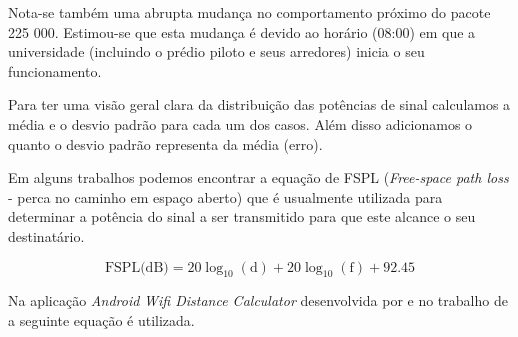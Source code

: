 Nota-se também uma abrupta mudança no comportamento próximo do pacote 225 000.
Estimou-se que esta mudança é devido ao horário (08:00) em que a universidade
(incluindo o prédio piloto e seus arredores) inicia o seu funcionamento.

Para ter uma visão geral clara da distribuição das potências de sinal calculamos
a média e o desvio padrão para cada um dos casos. Além disso adicionamos o
quanto o desvio padrão representa da média (erro).

\begin{table}[htb]
\end{table}


Em alguns trabalhos podemos
encontrar a equação de FSPL (\emph{Free-space path loss} - perca no caminho em
espaço aberto) que é usualmente utilizada para determinar a potência do sinal
a ser transmitido para que este alcance o seu destinatário.

\begin{equation}
	{\mbox{FSPL(dB)}}=20\log _{{10}}(\text{d})+20\log _{{10}}(\text{f})+92.45
\end{equation}

Na aplicação \emph{Android} \emph{Wifi Distance Calculator} desenvolvida por
 e no trabalho de  a seguinte
equação é utilizada.

